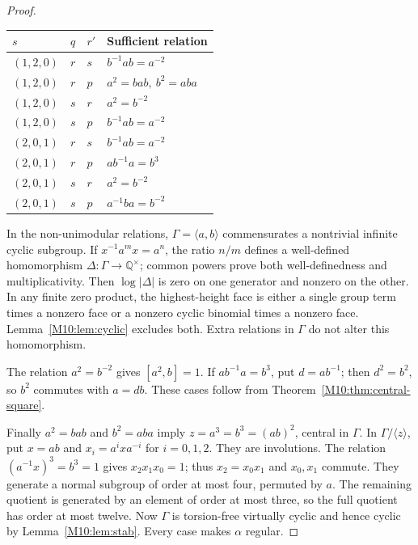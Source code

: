 \documentclass[11pt,a4paper,oneside]{report}
\theoremstyle{definition}
\theoremstyle{remark}
\newcommand{\Q}{\mathbb Q}
\begin{document}
\begin{proof}
\begin{center}\small
\begin{tabular}{@{}llll@{}}
\toprule
$s$ & $q$ & $r'$ & Sufficient relation\\
\midrule
$(1,2,0)$ & $r$ & $s$ & $b^{-1}ab=a^{-2}$\\
$(1,2,0)$ & $r$ & $p$ & $a^2=bab,\ b^2=aba$\\
$(1,2,0)$ & $s$ & $r$ & $a^2=b^{-2}$\\
$(1,2,0)$ & $s$ & $p$ & $b^{-1}ab=a^{-2}$\\
$(2,0,1)$ & $r$ & $s$ & $b^{-1}ab=a^{-2}$\\
$(2,0,1)$ & $r$ & $p$ & $ab^{-1}a=b^3$\\
$(2,0,1)$ & $s$ & $r$ & $a^2=b^{-2}$\\
$(2,0,1)$ & $s$ & $p$ & $a^{-1}ba=b^{-2}$\\
\bottomrule
\end{tabular}
\end{center}

In the non-unimodular relations, $\Gamma=\langle a,b\rangle$
commensurates a nontrivial infinite cyclic subgroup. If
$x^{-1}a^mx=a^n$, the ratio $n/m$ defines a well-defined
homomorphism $\Delta:\Gamma\to\Q^\times$; common powers prove
both well-definedness and multiplicativity. Then
$\log|\Delta|$ is zero on one generator and nonzero on the other.
In any finite zero product, the highest-height face is either a
single group term times a nonzero face or a nonzero cyclic
binomial times a nonzero face. Lemma~\ref{M10:lem:cyclic} excludes both.
Extra relations in $\Gamma$ do not alter this homomorphism.

The relation $a^2=b^{-2}$ gives $[a^2,b]=1$. If $ab^{-1}a=b^3$,
put $d=ab^{-1}$; then $d^2=b^2$, so $b^2$ commutes with
$a=db$. These cases follow from Theorem~\ref{M10:thm:central-square}.

Finally $a^2=bab$ and $b^2=aba$ imply
$z=a^3=b^3=(ab)^2$, central in $\Gamma$.
In $\Gamma/\langle z\rangle$, put $x=ab$ and
$x_i=a^ixa^{-i}$ for $i=0,1,2$. They are involutions.
The relation $(a^{-1}x)^3=b^3=1$ gives $x_2x_1x_0=1$;
thus $x_2=x_0x_1$ and $x_0,x_1$ commute. They generate a
normal subgroup of order at most four, permuted by $a$.
The remaining quotient is generated by an element of order at
most three, so the full quotient has order at most twelve.
Now $\Gamma$ is torsion-free virtually cyclic and hence cyclic
by Lemma~\ref{M10:lem:stab}. Every case makes $\alpha$ regular.
\end{proof}
\end{document}
